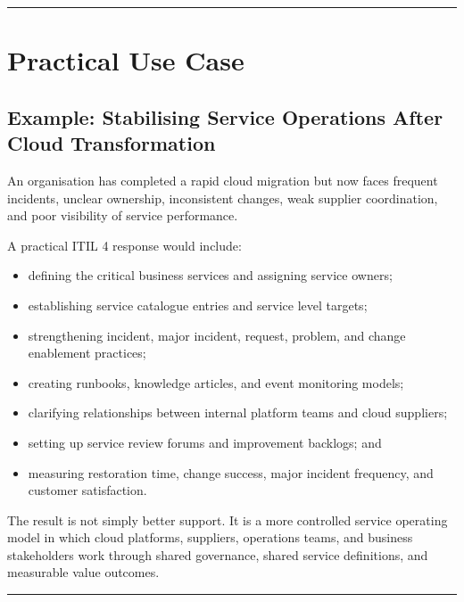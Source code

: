 \documentclass[
  letterpaper,
  DIV=11,
  numbers=noendperiod]{scrartcl}
\providecommand{\tightlist}{%
  \setlength{\itemsep}{0pt}\setlength{\parskip}{0pt}}
\begin{document}
\begin{center}\rule{0.5\linewidth}{0.5pt}\end{center}

\section{Practical Use Case}\label{practical-use-case}

\subsection{Example: Stabilising Service Operations After Cloud
Transformation}\label{example-stabilising-service-operations-after-cloud-transformation}

An organisation has completed a rapid cloud migration but now faces
frequent incidents, unclear ownership, inconsistent changes, weak
supplier coordination, and poor visibility of service performance.

A practical ITIL 4 response would include:

\begin{itemize}
\tightlist
\item
  defining the critical business services and assigning service owners;
\item
  establishing service catalogue entries and service level targets;
\item
  strengthening incident, major incident, request, problem, and change
  enablement practices;
\item
  creating runbooks, knowledge articles, and event monitoring models;
\item
  clarifying relationships between internal platform teams and cloud
  suppliers;
\item
  setting up service review forums and improvement backlogs; and
\item
  measuring restoration time, change success, major incident frequency,
  and customer satisfaction.
\end{itemize}

The result is not simply better support. It is a more controlled service
operating model in which cloud platforms, suppliers, operations teams,
and business stakeholders work through shared governance, shared service
definitions, and measurable value outcomes.

\begin{center}\rule{0.5\linewidth}{0.5pt}\end{center}
\end{document}
